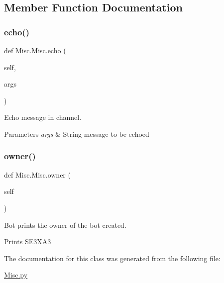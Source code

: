 \subsection{Member Function Documentation}
\mbox{\label{class_misc_1_1_misc_a03ff1d15d2b03eecb821bf7161e31889}} 
\subsubsection{\texorpdfstring{echo()}{echo()}}
{\footnotesize\ttfamily def Misc.\+Misc.\+echo (\begin{DoxyParamCaption}\item[{}]{self,  }\item[{}]{args }\end{DoxyParamCaption})}



Echo message in channel. 


\begin{DoxyParams}{Parameters}
{\em args} & String message to be echoed \\
\hline
\end{DoxyParams}
\mbox{\label{class_misc_1_1_misc_aef5ad8708eed0ead94b399a544548017}} 
\subsubsection{\texorpdfstring{owner()}{owner()}}
{\footnotesize\ttfamily def Misc.\+Misc.\+owner (\begin{DoxyParamCaption}\item[{}]{self }\end{DoxyParamCaption})}



Bot prints the owner of the bot created. 

Prints \textquotesingle{}S\+E3\+X\+A3\textquotesingle{} 

The documentation for this class was generated from the following file\+:\begin{DoxyCompactItemize}
\item 
\mbox{\hyperlink{_misc_8py}{Misc.\+py}}\end{DoxyCompactItemize}
